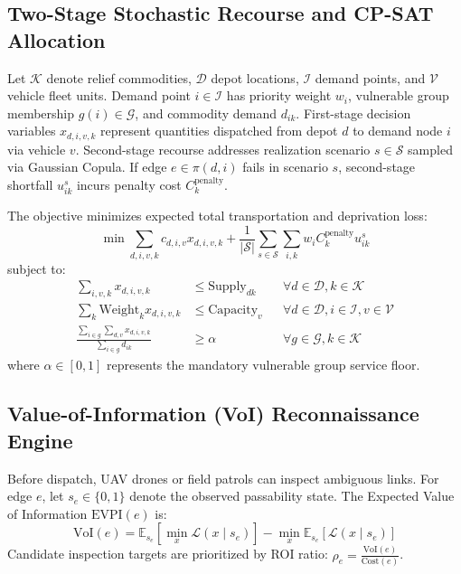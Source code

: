 \documentclass[11pt,a4paper]{article}
\begin{document}
\subsection{Two-Stage Stochastic Recourse and CP-SAT Allocation}
Let $\mathcal{K}$ denote relief commodities, $\mathcal{D}$ depot locations, $\mathcal{I}$ demand points, and $\mathcal{V}$ vehicle fleet units. Demand point $i \in \mathcal{I}$ has priority weight $w_i$, vulnerable group membership $g(i) \in \mathcal{G}$, and commodity demand $d_{ik}$.
First-stage decision variables $x_{d,i,v,k}$ represent quantities dispatched from depot $d$ to demand node $i$ via vehicle $v$.
Second-stage recourse addresses realization scenario $s \in \mathcal{S}$ sampled via Gaussian Copula. If edge $e \in \pi(d, i)$ fails in scenario $s$, second-stage shortfall $u_{ik}^s$ incurs penalty cost $C_k^{\text{penalty}}$.

The objective minimizes expected total transportation and deprivation loss:
\begin{equation}
    \min \sum_{d,i,v,k} c_{d,i,v} x_{d,i,v,k} + \frac{1}{|\mathcal{S}|} \sum_{s \in \mathcal{S}} \sum_{i, k} w_i C_k^{\text{penalty}} u_{ik}^s
\end{equation}
subject to:
\begin{align}
    \sum_{i, v, k} x_{d,i,v,k} &\le \text{Supply}_{dk} && \forall d \in \mathcal{D}, k \in \mathcal{K} \\
    \sum_{k} \text{Weight}_k x_{d,i,v,k} &\le \text{Capacity}_v && \forall d \in \mathcal{D}, i \in \mathcal{I}, v \in \mathcal{V} \\
    \frac{\sum_{i \in g} \sum_{d,v} x_{d,i,v,k}}{\sum_{i \in g} d_{ik}} &\ge \alpha && \forall g \in \mathcal{G}, k \in \mathcal{K}
\end{align}
where $\alpha \in [0, 1]$ represents the mandatory vulnerable group service floor.

\subsection{Value-of-Information (VoI) Reconnaissance Engine}
Before dispatch, UAV drones or field patrols can inspect ambiguous links. For edge $e$, let $s_e \in \{0, 1\}$ denote the observed passability state. The Expected Value of Information $\text{EVPI}(e)$ is:
\begin{equation}
    \text{VoI}(e) = \mathbb{E}_{s_e} \left[ \min_{x} \mathcal{L}(x \mid s_e) \right] - \min_{x} \mathbb{E}_{s_e} \left[ \mathcal{L}(x \mid s_e) \right]
\end{equation}
Candidate inspection targets are prioritized by ROI ratio: $\rho_e = \frac{\text{VoI}(e)}{\text{Cost}(e)}$.
\end{document}
